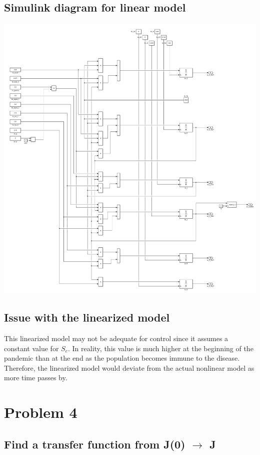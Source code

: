 \documentclass[fleqn]{article}
\begin{document}
\subsection*{Simulink diagram for linear model}
\begin{center}
    \includegraphics[width=\linewidth]{linear_simulink_diagram}
\end{center}

\subsection*{Issue with the linearized model}
This linearized model may not be adequate for control since it assumes a constant value for $S_e$. In reality, this value is much higher at the beginning of the pandemic than at the end as the population becomes immune to the disease. Therefore, the linearized model would deviate from the actual nonlinear model as more time passes by.

\section*{Problem 4}
\subsection*{Find a transfer function from J(0) $\rightarrow$ J}
\end{document}
